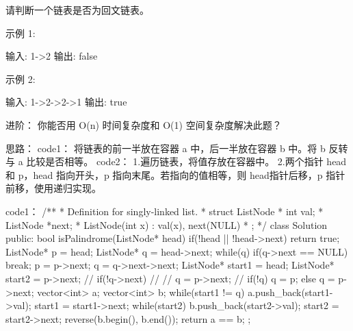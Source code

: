 请判断一个链表是否为回文链表。

示例 1:

输入: 1->2
输出: false

示例 2:

输入: 1->2->2->1
输出: true

进阶：
你能否用 O(n) 时间复杂度和 O(1) 空间复杂度解决此题？



























思路：
code1：
将链表的前一半放在容器 a 中，后一半放在容器 b 中。将 b 反转与 a 比较是否相等。
code2：
1.遍历链表，将值存放在容器中。
2.两个指针 head 和 p，head 指向开头，p 指向末尾。若指向的值相等，则 head指针后移，p 指针前移，使用递归实现。





















code1：
/**
 * Definition for singly-linked list.
 * struct ListNode {
 *     int val;
 *     ListNode *next;
 *     ListNode(int x) : val(x), next(NULL) {}
 * };
 */
class Solution {
public:
    bool isPalindrome(ListNode* head) {
        if(!head || !head->next) return true;
        ListNode* p = head;
        ListNode* q = head->next;
        while(q)
        {
            if(q->next == NULL) break;
            p = p->next;
            q = q->next->next;
        }
        ListNode* start1 = head;
        ListNode* start2 = p->next;
        // if(!q->next)
        // {
        //     q = p->next;
        // }
        if(!q)
        {
            q = p;
        }
        else
        {
            q = p->next;
        }
        vector<int> a;
        vector<int> b;
        while(start1 != q)
        {
            a.push_back(start1->val);
            start1 = start1->next;
        }
        while(start2)
        {
            b.push_back(start2->val);
            start2 = start2->next;
        }
        reverse(b.begin(), b.end());
        return a == b;
    }
};















